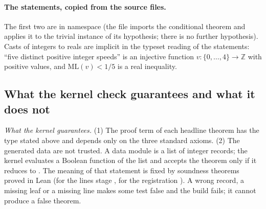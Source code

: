 \documentclass[11pt]{article}
\theoremstyle{remark}
\newcommand{\ML}{\mathrm{ML}}
\newcommand{\Z}{\mathbb{Z}}
\begin{document}
\paragraph{The statements, copied from the source files.}
The first two are in namespace  (the file  imports the conditional theorem  and applies it to the trivial instance of its hypothesis; there is no further hypothesis). Casts of integers to reals are implicit in the typeset reading of the statements: ``five distinct positive integer speeds'' is an injective function $v:\{0,\dots,4\}\to\Z$ with positive values, and $\ML(v)<1/5$ is a real inequality.

\subsection{What the kernel check guarantees and what it does not}\label{sec:guarantee}

\emph{What the kernel guarantees.} (1) The proof term of each headline theorem has the type stated above and depends only on the three standard axioms. (2) The generated data are not trusted. A data module is a list of integer records; the kernel evaluates a Boolean function of the list and accepts the theorem  only if it reduces to . The meaning of that statement is fixed by soundness theorems proved in Lean (for the lines stage , for the registration ). A wrong record, a missing leaf or a missing line makes some test false and the build fails; it cannot produce a false theorem.
\end{document}
